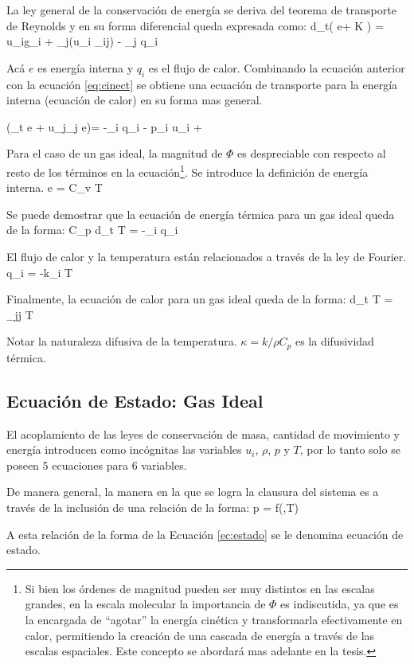 La ley general de la conservación de energía se deriva del teorema de transporte de Reynolds y en su forma diferencial queda expresada como:
\be 
\rho d_t\left( e+ K \right) = u_i\rho g_i + \partial_j(u_i \sigma_{ij}) - \partial_j q_i
\ee

Acá $e$ es energía interna y $q_i$ es el flujo de calor. Combinando la ecuación anterior con la ecuación \ref{eq:cinect} se obtiene una ecuación de transporte para la energía interna (ecuación de calor) en su forma mas general.

\be \label{eq:energia_e}
\rho\left(\partial_t e + u_j\partial_j e\right)= -\partial_i q_i - p\partial_i u_i + \Phi
\ee

Para el caso de un gas ideal, la magnitud de $\Phi$ es despreciable con respecto al resto de los términos en la ecuación\footnote{Si bien los órdenes de magnitud pueden ser muy distintos en las escalas grandes, en la escala molecular la importancia de $\Phi$ es indiscutida, ya que es la encargada de ``agotar'' la energía cinética y transformarla efectivamente en calor, permitiendo la creación de una cascada de energía a través de las escalas espaciales. Este concepto se abordará mas adelante en la tesis.}. Se introduce la definición de energía interna.
\be 
e = C_v T
\ee

Se puede demostrar que la ecuación de energía térmica para un gas ideal queda de la forma:
\be 
\rho C_p d_t T = -\partial_i q_i
\ee

El flujo de calor y la temperatura están relacionados a través de la ley de Fourier.
\be 
q_i = -k\partial_i T
\ee

Finalmente, la ecuación de calor para un gas ideal queda de la forma:
\be 
d_t T = \kappa \partial_{jj} T
\ee

Notar la naturaleza difusiva de la temperatura. $\kappa = k/\rho C_p$ es la difusividad térmica.
\subsection{Ecuación de Estado: Gas Ideal}
El acoplamiento de las leyes de conservación de masa, cantidad de movimiento y energía introducen como incógnitas las variables $u_i$, $\rho$, $p$ y $T$, por lo tanto solo se poseen 5 ecuaciones para 6 variables. 

De manera general, la manera en la que se logra la clausura del sistema es a través de la inclusión de una relación de la forma:
\be\label{ec:estado}
p = f(\rho,T)
\ee 

A esta relación de la forma de la Ecuación \ref{ec:estado} se le denomina ecuación de estado.

